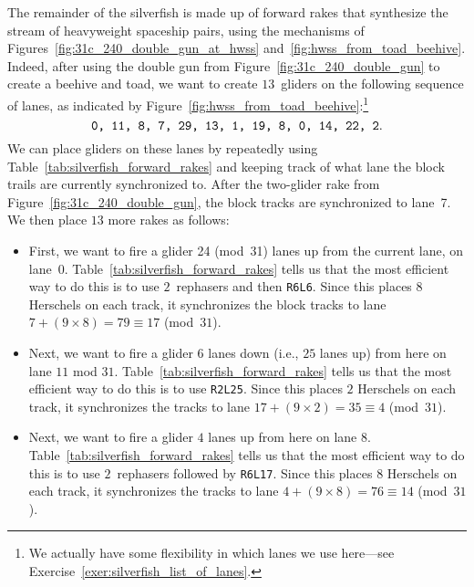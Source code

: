 The remainder of the silverfish is made up of forward rakes that synthesize the stream of heavyweight spaceship pairs, using the mechanisms of Figures~\ref{fig:31c_240_double_gun_at_hwss} and~\ref{fig:hwss_from_toad_beehive}. Indeed, after using the double gun from Figure~\ref{fig:31c_240_double_gun} to create a beehive and toad, we want to create $13$~gliders on the following sequence of lanes, as indicated by Figure~\ref{fig:hwss_from_toad_beehive}:\footnote{We actually have some flexibility in which lanes we use here---see Exercise~\ref{exer:silverfish_list_of_lanes}.}\label{page:silverfish_lanes}
\[
	\text{\texttt{0, 11, 8, 7, 29, 13, 1, 19, 8, 0, 14, 22, 2}.}
\]
We can place gliders on these lanes by repeatedly using Table~\ref{tab:silverfish_forward_rakes} and keeping track of what lane the block trails are currently synchronized to. After the two-glider rake from Figure~\ref{fig:31c_240_double_gun}, the block tracks are synchronized to lane~7. We then place $13$ more rakes as follows:\smallskip

\begin{itemize}
	\item First, we want to fire a glider 24 (mod~31) lanes up from the current lane, on lane~0. Table~\ref{tab:silverfish_forward_rakes} tells us that the most efficient way to do this is to use $2$~rephasers and then \texttt{R6L6}. Since this places $8$ Herschels on each track, it synchronizes the block tracks to lane $7 + (9 \times 8) = 79 \equiv 17$ (mod~$31$).\smallskip
	
	\item Next, we want to fire a glider $6$ lanes down (i.e., $25$ lanes up) from here on lane $11$ mod $31$. Table~\ref{tab:silverfish_forward_rakes} tells us that the most efficient way to do this is to use \texttt{R2L25}. Since this places $2$ Herschels on each track, it synchronizes the tracks to lane $17 + (9 \times 2) = 35 \equiv 4$ (mod~$31$).\smallskip
	
	\item Next, we want to fire a glider $4$ lanes up from here on lane $8$. Table~\ref{tab:silverfish_forward_rakes} tells us that the most efficient way to do this is to use $2$~rephasers followed by \texttt{R6L17}. Since this places $8$ Herschels on each track, it synchronizes the tracks to lane $4 + (9 \times 8) = 76 \equiv 14$ (mod~$31$).\smallskip
\end{itemize}

